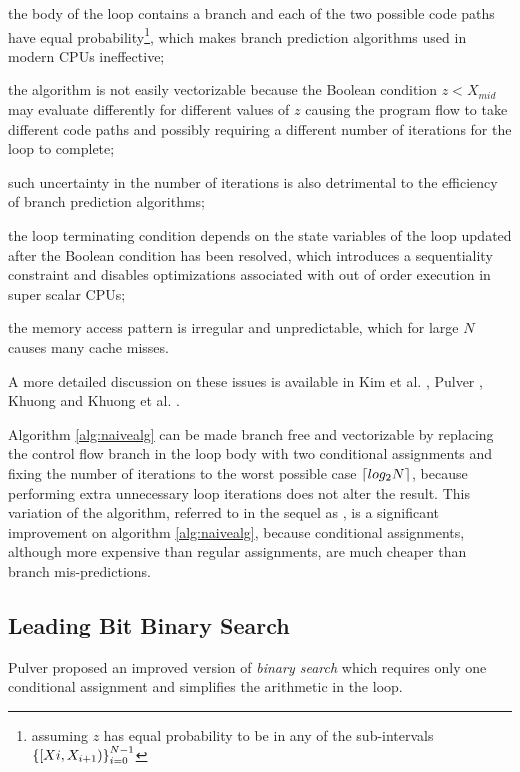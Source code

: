 \documentclass[preprint,1p,times]{elsarticle}
\begin{document}
\begin{myitemize}
	\item the body of the loop contains a branch and each of the two possible code paths have equal probability\footnote{assuming $z$ has equal probability to be in any of the sub-intervals $\left \{ [X{i},X_{i+1}) \right \}_{i=0}^{N-1}$}, which makes branch prediction algorithms used in modern CPUs ineffective; 
	\item the algorithm is not easily vectorizable because the Boolean condition $z<X_{mid}$ may evaluate differently for different values of $z$ causing the program flow to take different code paths and possibly requiring a different number of iterations for the loop to complete;
	\item such uncertainty in the number of iterations is also detrimental to the efficiency of branch prediction algorithms;
    \item the loop terminating condition depends on the state variables of the loop updated after the Boolean condition has been resolved, which introduces a sequentiality constraint and disables optimizations associated with out of order execution in super scalar CPUs;
    \item the memory access pattern is irregular and unpredictable, which for large $N$ causes many cache misses.
\end{myitemize}
A more detailed discussion on these issues is available in Kim et al. \cite{Kim2011}, Pulver \cite{Pulver2011}, Khuong \cite{Khuong2012} and Khuong et al. \cite{Morin2015}.

Algorithm \ref{alg:naivealg} can be made branch free and vectorizable by replacing the control flow branch in the loop body with two conditional assignments and fixing the number of iterations to the worst possible case $\left \lceil log_2N \right \rceil$, because performing extra unnecessary loop iterations does not alter the result. 
This variation of the algorithm, referred to in the sequel as \textit{\ClassicModName}, is a significant improvement on algorithm \ref{alg:naivealg}, because conditional assignments, although more expensive than regular assignments, are much cheaper than branch mis-predictions.

\subsection{Leading Bit Binary Search}
\label{sec:optimbinary}

Pulver \cite{Pulver2011} proposed an improved version of \textit{binary search} which requires only one conditional assignment and simplifies the arithmetic in the loop.
\end{document}

